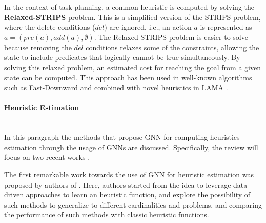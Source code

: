 In the context of task planning, a common heuristic is computed by solving the \textbf{Relaxed-STRIPS} problem. This is a simplified version of the STRIPS problem, where the delete conditions ($del$) are ignored, i.e., an action $a$ is represented as $a = \left(pre(a), add(a), \emptyset \right)$. The Relaxed-STRIPS problem is easier to solve because removing the $del$ conditions relaxes some of the constraints, allowing the state to include predicates that logically cannot be true simultaneously. By solving this relaxed problem, an estimated cost for reaching the goal from a given state can be computed. This approach has been used in well-known algorithms such as Fast-Downward \cite{helmert2006fast} and combined with novel heuristics in LAMA \cite{richter2010lama}.

\paragraph*{Heuristic Estimation}\mbox{}\\
In this paragraph the methods that propose GNN for computing heuristics estimation through the usage of GNNs are discussed. Specifically, the review will focus on two recent works \cite{shen2020learning,chen2024learning}.

The first remarkable work towards the use of GNN for heuristic estimation was proposed by authors of \cite{shen2020learning}. Here, authors started from the idea to leverage data-driven approaches to learn an heuristic function, and explore the possibility of such methods to generalize to different cardinalities and problems, and comparing the performance of such methods with classic heuristic functions.

